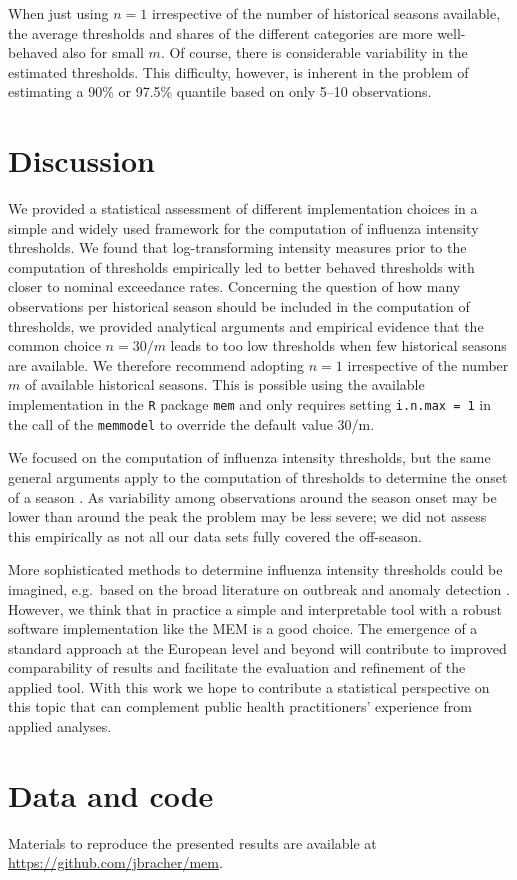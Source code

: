 \documentclass{article}
\begin{document}
When just using $n = 1$ irrespective of the number of historical seasons available, the average thresholds and shares of the different categories are more well-behaved also for small $m$. Of course, there is considerable variability in the estimated thresholds. This difficulty, however, is inherent in the problem of estimating a 90\% or 97.5\% quantile based on only 5--10 observations.

\section{Discussion}
\label{sec:discussion}

We provided a statistical assessment of different implementation choices in a simple and widely used framework for the computation of influenza intensity thresholds. We found that log-transforming intensity measures prior to the computation of thresholds empirically led to better behaved thresholds with closer to nominal exceedance rates. Concerning the question of how many observations per historical season should be included in the computation of thresholds, we provided analytical arguments and empirical evidence that the common choice $n = 30/m$ leads to too low thresholds when few historical seasons are available. We therefore recommend adopting $n = 1$ irrespective of the number $m$ of available historical seasons. This is possible using the available implementation in the \texttt{R} package \texttt{mem} and only requires setting \texttt{i.n.max = 1} in the call of the \texttt{memmodel} to override the default value 30/m.

We focused on the computation of influenza intensity thresholds, but the same general arguments apply to the computation of thresholds to determine the onset of a season \citep{Vega2012}. As variability among observations around the season onset may be lower than around the peak the problem may be less severe; we did not assess this empirically as not all our data sets fully covered the off-season.

More sophisticated methods to determine influenza intensity thresholds could be imagined, e.g.\ based on the broad literature on outbreak and anomaly detection \citep{Unkel2012}. However, we think that in practice a simple and interpretable tool with a robust software implementation like the MEM is a good choice. The emergence of a standard approach at the European level and beyond will contribute to improved comparability of results and facilitate the evaluation and refinement of the applied tool. With this work we hope to contribute a statistical perspective on this topic that can complement public health practitioners' experience from applied analyses.


\section*{Data and code}

Materials to reproduce the presented results are available at \url{https://github.com/jbracher/mem}.




\end{document}
